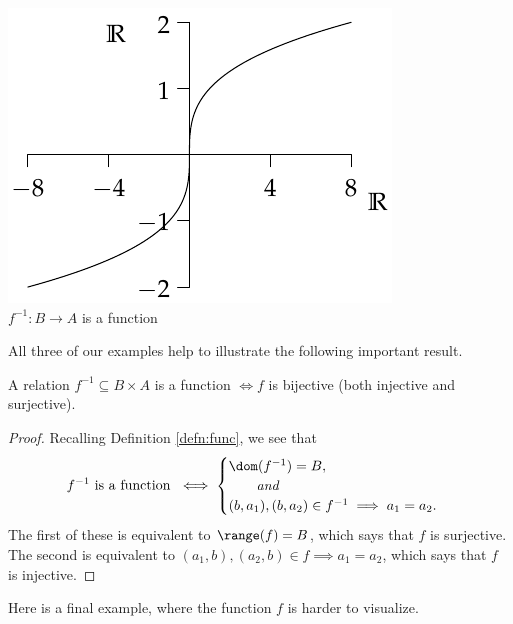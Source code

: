 \begin{examples}
\begin{center}
\begin{minipage}{0.35\textwidth}
\includegraphics[width=\textwidth]{relations-23-reln3}\\
$f^{-1}:B\to A$ is a function
\end{minipage}
\end{center}
\end{examples}\pagebreak[2]

\noindent All three of our examples help to illustrate the following important result.

\begin{thm}\label{thm:finverse}
A relation $f^{-1}\subseteq B\times A$ is a function $\iff f$ is bijective (both injective and surjective).
\end{thm}

\begin{proof}
Recalling Definition \ref{defn:func}, we see that
\[f^{-1}\text{ is a function }\iff\begin{cases}
\dom(f^{-1})=B,\\
\qquad\text{\emph{and}}\\
(b,a_1),(b,a_2)\in f^{-1}\implies a_1=a_2.
\end{cases}\]
The first of these is equivalent to $\range(f)=B$, which says that $f$ is surjective.\\
The second is equivalent to $(a_1,b),(a_2,b)\in f\implies a_1=a_2$, which says that $f$ is injective.
\end{proof}

\noindent Here is a final example, where the function $f$ is harder to visualize.

